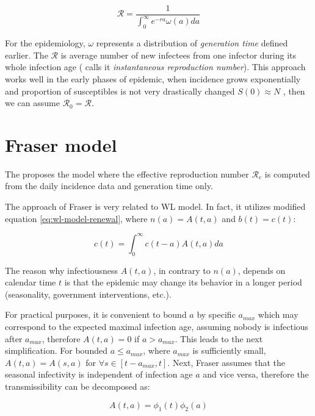 \documentclass[
  digital, %
  oneside, %
  lof,     %
  lot,     %
]{fithesis4}
\begin{document}
\begin{equation}\label{eq:wl-model-euler-lotka-R-final}
  \mathcal{R} = \frac{1}{\int_{0}^{\infty} e^{-ra} \omega(a) da}
\end{equation}

For the epidemiology, $\omega$ represents
a distribution of \textit{generation time} defined earlier.
The $\mathcal{R}$ is average number of new infectees from one infector
during its whole infection age (\cite{fraser2007} 
calls it \textit{instantaneous reproduction number}).
This approach works well in the early phases of epidemic,
when incidence grows exponentially
and proportion of susceptibles is not very drastically
changed $S(0) \approx N$ \cite{park2021}, then we can assume 
$\mathcal{R}_0 = \mathcal{R}$.


\section{Fraser model}
\label{sec:fraser-model}

The \cite{fraser2007} proposes the model where the effective 
reproduction number $\mathcal{R}_e$ is computed from the 
daily incidence data and generation time only.

The approach of Fraser is very related to WL
model. In fact, it utilizes modified equation
\eqref{eq:wl-model-renewal}, where 
$n(a) = A(t, a)$ and $b(t) = c(t)$:

\begin{equation}
  c( t ) = \int^{\infty}_0 c ( t - a ) A ( t, a ) da
\end{equation}

The reason why infectiousness $A(t, a)$, in contrary to $n(a)$, depends on calendar time $t$ is that the epidemic may change its behavior in a longer period (seasonality, government interventions, etc.).

For practical purposes, it is convenient to bound $a$ 
by specific $a_{max}$ which may correspond to the expected
maximal infection age, assuming nobody is infectious after 
$a_{max}$, therefore $A(t, a) = 0$ if $a > a_{max}$.
This leads to the next simplification.
For bounded $a \leq a_{max}$, where $a_{max}$ is 
sufficiently small, $A(t, a) = A(s, a)$ for 
$\forall s \in \left[ t - a_{max}, t \right]$.
Next, Fraser assumes that the seasonal infectivity is 
independent of infection age $a$ and vice versa, therefore
the transmissibility can be decomposed as:

\begin{equation}
A(t, a) = \phi_1(t) \phi_2(a)
\end{equation}
\end{document}
